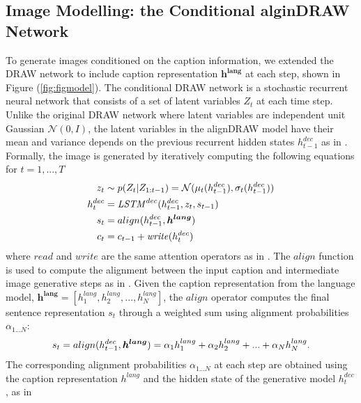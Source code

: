 \documentclass{article} %
\newcommand{\comm}[1]{}
\newcommand{\hlang}{h^{lang}}
\newcommand{\hlangall}{\boldsymbol{h^{lang}}}
\newcommand{\hdec}{h^{dec}}
\newcommand{\readop}{\mathit{read}}
\newcommand{\writeop}{\mathit{write}}
\newcommand{\decoder}{\mathit{LSTM}^{dec}}
\newcommand{\canv}{c}
\newcommand{\lat}{z}
\newcommand{\Lat}{Z}
\newcommand{\prior}{p}
\begin{document}
\subsection{Image Modelling: the Conditional alginDRAW Network}
\comm{
The DRAW network \cite{gregor_draw} is a sequential probabilistic model generating images by accumulating the output at each iterative step. While the original DRAW network assumes the latent variables are independent, it has shown in \citep{bachman_sdm} the model performance is improved by including the dependencies of latent variables. 
}
To generate images conditioned on the caption information, we extended the DRAW network\citep{gregor_draw} to include caption representation $\hlangall$ at each step, shown in Figure (\ref{fig:figmodel}). The conditional DRAW network is a stochastic recurrent neural network that consists of a set of latent variables $\Lat_t$ at each time step. Unlike the original DRAW network where latent variables are independent unit Gaussian $\mathcal{N}(0, I)$, the latent variables in the alignDRAW model have their mean and variance depends on the previous recurrent hidden states $\hdec_{t-1}$ as in \cite{bachman_sdm}. Formally, the image is generated by iteratively computing the following equations for $t=1,...,T$
\begin{align}
\vspace{-0.1in}
\label{eq:x_hat}
\lat_t &\sim \prior(\Lat_t|\Lat_{1:t-1}) = \mathcal{N}(\mu_{t}(\hdec_{t-1}), \sigma_{t}(\hdec_{t-1}))\\
\hdec_t &= \decoder(\hdec_{t-1}, z_t, s_{t-1})\\
s_{t} &= align(\hdec_{t-1}, \hlangall) \\
\label{eq:write}
\canv_t &= \canv_{t-1} + \writeop(\hdec_t)
\end{align}
where $\readop$ and $\writeop$ are the same attention operators as in \citep{gregor_draw}.
The $align$ function is used to compute the alignment between the input caption and intermediate image generative steps as in \cite{bahdanau_mt}. Given the caption representation from the language model, $\hlangall = [\hlang_{1}, \hlang_{2}, ..., \hlang_{N}]$, the $align$ operator computes the final sentence representation $s_t$ through a weighted sum using alignment probabilities $\alpha_{1...N}$:
\begin{align}
\vspace{-0.1in}
s_t=align(\hdec_{t-1}, \hlangall) = \alpha_{1}\hlang_{1} + \alpha_{2}\hlang_{2} + ... + \alpha_{N}\hlang_{N}.
\end{align}
The corresponding alignment probabilities $\alpha_{1...N}$ at each step are obtained using the caption representation $\hlang$ and the hidden state of the generative model $\hdec_{t}$, as in \citep{bahdanau_mt}
\comm{
\begin{align}
e_{tj} &= v^{T}tanh(U\hlang_{j} + W\hdec_{t} + b)\\
\alpha_{j} &= \frac{exp(e_{tj})}{\sum_{j=1}^{N}exp(e_{tj})}.
\end{align}
}
\comm{
Here $\hlang_{0}$ is initialized to the learned bias.
Setting $\alpha_{1...N}$ to $\frac{1}{N}$ turns the encoder into the vanilla model introduced in \citep{cho_mt} without the attention. 
}
\end{document}
